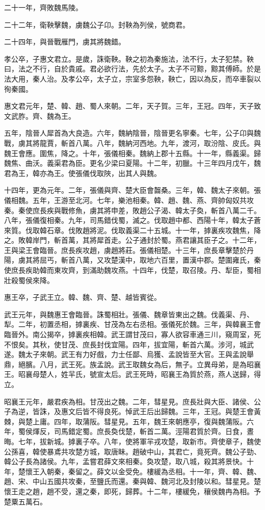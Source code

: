 二十一年，齊敗魏馬陵。

二十二年，衛鞅擊魏，虜魏公子卬。封鞅為列侯，號商君。

二十四年，與晉戰雁門，虜其將魏錯。

孝公卒，子惠文君立。是歲，誅衛鞅。鞅之初為秦施法，法不行，太子犯禁。鞅曰，法之不行，自於貴戚。君必欲行法，先於太子。太子不可黥，黥其傅師。於是法大用，秦人治。及孝公卒，太子立，宗室多怨鞅，鞅亡，因以為反，而卒車裂以徇秦國。

惠文君元年，楚、韓、趙、蜀人來朝。二年，天子賀。三年，王冠。四年，天子致文武胙。齊、魏為王。

五年，陰晉人犀首為大良造。六年，魏納陰晉，陰晉更名寧秦。七年，公子卬與魏戰，虜其將龍賈，斬首八萬。八年，魏納河西地。九年，渡河，取汾陰、皮氏。與魏王會應。圍焦，降之。十年，張儀相秦。魏納上郡十五縣。十一年，縣義渠。歸魏焦、曲沃。義渠君為臣。更名少梁曰夏陽。十二年，初臘。十三年四月戊午，魏君為王，韓亦為王。使張儀伐取陜，出其人與魏。

十四年，更為元年。二年，張儀與齊、楚大臣會齧桑。三年，韓、魏太子來朝。張儀相魏。五年，王游至北河。七年，樂池相秦。韓、趙、魏、燕、齊帥匈奴共攻秦。秦使庶長疾與戰修魚，虜其將申差，敗趙公子渴、韓太子奐，斬首八萬二千。八年，張儀復相秦。九年，司馬錯伐蜀，滅之。伐取趙中都、西陽十年，韓太子蒼來質。伐取韓石章。伐敗趙將泥。伐取義渠二十五城。十一年，摢裏疾攻魏焦，降之。敗韓岸門，斬首萬，其將犀首走。公子通封於蜀。燕君讓其臣子之。十二年，王與梁王會臨晉。庶長疾攻趙，虜趙將莊。張儀相楚。十三年，庶長章擊楚於丹陽，虜其將屈丐，斬首八萬，又攻楚漢中，取地六百里，置漢中郡。楚圍雍氏，秦使庶長疾助韓而東攻齊，到滿助魏攻燕。十四年，伐楚，取召陵。丹、犁臣，蜀相壯殺蜀侯來降。

惠王卒，子武王立。韓、魏、齊、楚、越皆賓從。

武王元年，與魏惠王會臨晉。誅蜀相壯。張儀、魏章皆東出之魏。伐義渠、丹、犁。二年，初置丞相，摢裏疾、甘茂為左右丞相。張儀死於魏。三年，與韓襄王會臨晉外。南公揭卒，摢裏疾相韓。武王謂甘茂曰，寡人欲容車通三川，窺周室，死不恨矣。其秋，使甘茂、庶長封伐宜陽。四年，拔宜陽，斬首六萬。涉河，城武遂。魏太子來朝。武王有力好戲，力士任鄙、烏獲、孟說皆至大官。王與孟說舉鼎，絕臏。八月，武王死。族孟說。武王取魏女為后，無子。立異母弟，是為昭襄王。昭襄母楚人，姓羋氏，號宣太后。武王死時，昭襄王為質於燕，燕人送歸，得立。

昭襄王元年，嚴君疾為相。甘茂出之魏。二年，彗星見。庶長壯與大臣、諸侯、公子為逆，皆誅，及惠文后皆不得良死。悼武王后出歸魏。三年，王冠。與楚王會黃棘，與楚上庸。四年，取蒲阪。彗星見。五年，魏王來朝應亭，復與魏蒲阪。六年，蜀侯煇反，司馬錯定蜀。庶長奐伐楚，斬首二萬。涇陽君質於齊。日食，晝晦。七年，拔新城。摢裏子卒。八年，使將軍羋戎攻楚，取新市。齊使章子，魏使公孫喜，韓使暴鳶共攻楚方城，取唐眛。趙破中山，其君亡，竟死齊。魏公子勁、韓公子長為諸侯。九年，孟嘗君薛文來相秦。奐攻楚，取八城，殺其將景快。十年，楚懷王入朝秦，秦留之。薛文以金受免。樓緩為丞相。十一年，齊、韓、魏、趙、宋、中山五國共攻秦，至鹽氏而還。秦與韓、魏河北及封陵以和。彗星見。楚懷王走之趙，趙不受，還之秦，即死，歸葬。十二年，樓緩免，穰侯魏冉為相。予楚粟五萬石。

